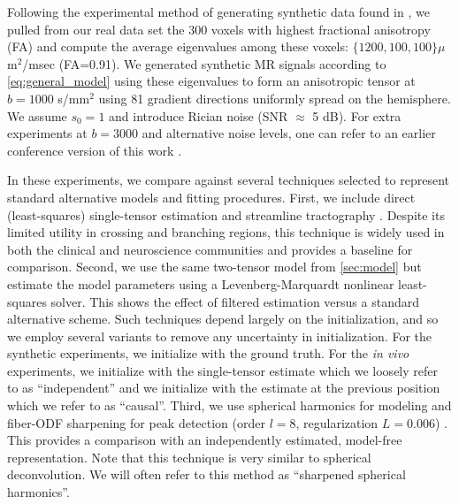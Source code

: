 \documentclass[final,hyperref]{gatech-thesis}
\newcommand{\bn}[1]{\ensuremath{b\!=\!#1}\xspace}
\newcommand{\bone}{\bn{1000}}
\newcommand{\bthree}{\bn{3000}}
\newcommand{\snr}[1]{SNR $\approx$ #1 dB}
\newcommand{\invivo}{\textit{in vivo}\xspace}
\begin{document}
Following the experimental method of generating synthetic data found in
\cite{Tournier2004,Descoteaux2009tmi,Schultz2008}, we pulled from our real
data set the 300 voxels with highest fractional anisotropy (FA) and compute
the average eigenvalues among these voxels:  $\{1200, 100, 100\}\mu$m$^2$/msec
(FA=0.91).  We generated synthetic MR signals according to
\autoref{eq:general_model} using these eigenvalues to form an anisotropic
tensor at \bone s/mm$^2$ using 81 gradient directions uniformly spread on the
hemisphere.  We assume $s_0=1$ and introduce Rician noise (\snr{5}).  For
extra experiments at \bthree and alternative noise levels, one can refer to an
earlier conference version of this work \cite{malcolm2009ipmi}.

In these experiments, we compare against several techniques selected to
represent standard alternative models and fitting procedures.
%
First, we include direct (least-squares) single-tensor estimation and
streamline tractography \cite{Basser2000}.  Despite its limited utility in
crossing and branching regions, this technique is widely used in both the
clinical and neuroscience communities and provides a baseline for comparison.
%
Second, we use the same two-tensor model from \autoref{sec:model} but estimate
the model parameters using a Levenberg-Marquardt nonlinear least-squares
solver.  This shows the effect of filtered estimation versus a standard
alternative scheme.  Such techniques depend largely on the initialization, and
so we employ several variants to remove any uncertainty in initialization.
For the synthetic experiments, we initialize with the ground truth.  For the
\invivo experiments, we initialize with the single-tensor estimate
\cite{Peled2006} which we loosely refer to as ``independent'' and we
initialize with the estimate at the previous position which we refer to as
``causal''.
%
Third, we use spherical harmonics for modeling and fiber-ODF sharpening for
peak detection (order $l=8$, regularization $L=0.006$)
\cite{Tournier2004,Descoteaux2009tmi}.  This provides a comparison with an
independently estimated, model-free representation.  Note that this technique
is very similar to spherical deconvolution.  We will often refer to this
method as ``sharpened spherical harmonics''.
\end{document}

